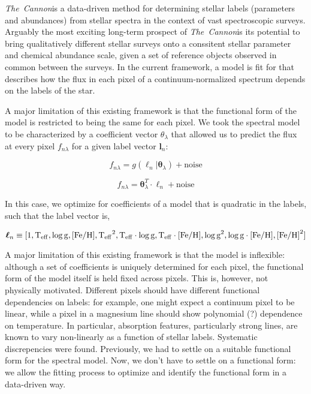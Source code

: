 \documentclass[12pt, preprint]{aastex}
\newcommand{\tc}{\textsl{The~Cannon}}
\newcommand{\set}[1]{\bm{#1}}
\newcommand{\starlabel}{\ell}
\newcommand{\starlabelvec}{\set{\starlabel}}
\newcommand{\teff}{\mbox{$\rm T_{eff}$}}
\newcommand{\feh}{\mbox{$\rm [Fe/H]$}}
\newcommand{\logg}{\mbox{$\rm \log g$}}
\begin{document}
\tc is a data-driven method for determining stellar labels (parameters and 
abundances) from stellar
spectra in the context of vast spectroscopic surveys. Arguably the most
exciting long-term prospect of \tc is its potential to bring qualitatively
different stellar surveys onto a conssitent stellar parameter and chemical
abundance scale, given a set of reference objects observed in common between
the surveys. In the current framework, a model is fit for that describes
how the flux in each pixel of a continuum-normalized spectrum depends
on the labels of the star.

A major limitation of this existing framework is that the functional form of 
the model is restricted to being the same for each pixel. We took the 
spectral model to be characterized by a coefficient vector $\theta_\lambda$ 
that allowed us to predict the flux at every pixel $f_{n \lambda}$ for a 
given label vector $\textbf{l}_n$:

\begin{equation}
  f_{n\lambda} = g(\starlabelvec_n | \set{\theta}_\lambda) + \mbox{noise} 
\end{equation}

\begin{equation}
  f_{n\lambda} = \set{\theta}_\lambda^T \cdot \starlabelvec_n + \mbox{noise}  
\end{equation}

In this case, we optimize for coefficients of a model that is quadratic in the
labels, such that the label vector is,

\begin{equation}
  \starlabelvec_n \equiv 
  [1, \teff, \logg, \feh, \teff^2, \teff\cdot\logg, \teff\cdot\feh, \logg^2, \logg\cdot\feh, \feh^2]
\end{equation}

A major limitation of this existing framework is that the model is inflexible:
although a set of coefficients is uniquely determined for each pixel, 
the functional form of the model itself is held fixed across pixels. 
This is, however, not physically motivated.  Different pixels should have 
different functional dependencies on labels: for example, one might expect a 
continuum pixel to be linear, while a pixel in a magnesium line should show 
polynomial (?) dependence on temperature. In particular, absorption features,
particularly strong lines, are known to vary non-linearly as a function of 
stellar labels. Systematic discrepencies were found. Previously, we had to 
settle on a suitable functional form for the spectral model. Now, we don't have
to settle on a functional form: we allow the fitting process to optimize and
identify the functional form in a data-driven way.
\end{document}
